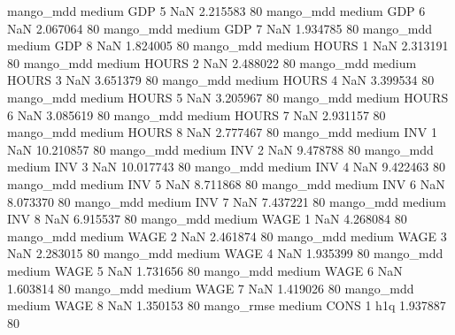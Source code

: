         mango_mdd     medium      GDP                 5                  NaN  2.215583 80
        mango_mdd     medium      GDP                 6                  NaN  2.067064 80
        mango_mdd     medium      GDP                 7                  NaN  1.934785 80
        mango_mdd     medium      GDP                 8                  NaN  1.824005 80
        mango_mdd     medium    HOURS                 1                  NaN  2.313191 80
        mango_mdd     medium    HOURS                 2                  NaN  2.488022 80
        mango_mdd     medium    HOURS                 3                  NaN  3.651379 80
        mango_mdd     medium    HOURS                 4                  NaN  3.399534 80
        mango_mdd     medium    HOURS                 5                  NaN  3.205967 80
        mango_mdd     medium    HOURS                 6                  NaN  3.085619 80
        mango_mdd     medium    HOURS                 7                  NaN  2.931157 80
        mango_mdd     medium    HOURS                 8                  NaN  2.777467 80
        mango_mdd     medium      INV                 1                  NaN 10.210857 80
        mango_mdd     medium      INV                 2                  NaN  9.478788 80
        mango_mdd     medium      INV                 3                  NaN 10.017743 80
        mango_mdd     medium      INV                 4                  NaN  9.422463 80
        mango_mdd     medium      INV                 5                  NaN  8.711868 80
        mango_mdd     medium      INV                 6                  NaN  8.073370 80
        mango_mdd     medium      INV                 7                  NaN  7.437221 80
        mango_mdd     medium      INV                 8                  NaN  6.915537 80
        mango_mdd     medium     WAGE                 1                  NaN  4.268084 80
        mango_mdd     medium     WAGE                 2                  NaN  2.461874 80
        mango_mdd     medium     WAGE                 3                  NaN  2.283015 80
        mango_mdd     medium     WAGE                 4                  NaN  1.935399 80
        mango_mdd     medium     WAGE                 5                  NaN  1.731656 80
        mango_mdd     medium     WAGE                 6                  NaN  1.603814 80
        mango_mdd     medium     WAGE                 7                  NaN  1.419026 80
        mango_mdd     medium     WAGE                 8                  NaN  1.350153 80
       mango_rmse     medium     CONS                 1                  h1q  1.937887 80
